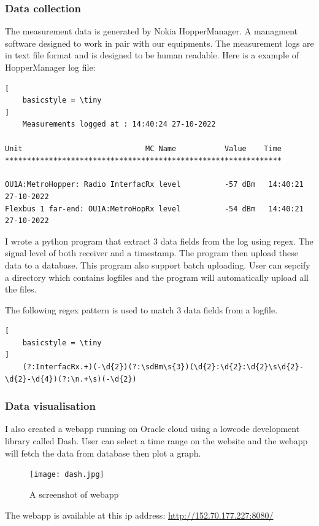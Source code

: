 \subsubsection{Data collection}
The measurement data is generated by Nokia HopperManager. A managment software designed to work in pair
with our equipments. The measurement logs are in text file format and is designed to be human readable.
Here is a example of HopperManager log file:

\begin{lstlisting}[
    basicstyle = \tiny
]
    Measurements logged at : 14:40:24 27-10-2022

Unit                            MC Name           Value    Time                 
***************************************************************

OU1A:MetroHopper: Radio InterfacRx level          -57 dBm   14:40:21 27-10-2022
Flexbus 1 far-end: OU1A:MetroHopRx level          -54 dBm   14:40:21 27-10-2022
\end{lstlisting}

I wrote a python program that extract 3 data fields from the log using regex. The signal level of both receiver and a timestamp.
The program then upload these data to a database. This program also support batch uploading. User can sepcify
a directory which contains logfiles and the program will automatically upload all the files.

The following regex pattern is used to match 3 data fields from a logfile.
\begin{lstlisting}[
    basicstyle = \tiny
]
    (?:InterfacRx.+)(-\d{2})(?:\sdBm\s{3})(\d{2}:\d{2}:\d{2}\s\d{2}-\d{2}-\d{4})(?:\n.+\s)(-\d{2})
\end{lstlisting}

\subsubsection{Data visualisation}

I also created a webapp running on Oracle cloud using a lowcode development library called Dash.
User can select a time range on the website and the webapp will fetch the data from database then plot a graph.

\begin{figure}[h!]
    \centering
    \texttt{[image: dash.jpg]}
    \caption{A screenshot of webapp}
    \label{fig:dash}
\end{figure}

The webapp is available at this ip address: \url{http://152.70.177.227:8080/}

